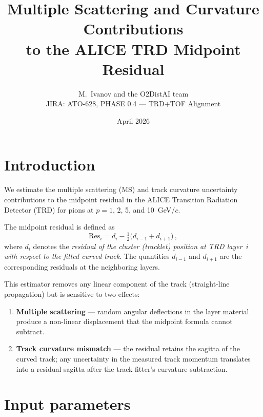 \documentclass[11pt,a4paper]{article}
\title{Multiple Scattering and Curvature Contributions\\
to the ALICE TRD Midpoint Residual}
\author{M.~Ivanov and the O2DistAI team\\[2pt]
{\normalsize JIRA: ATO-628, PHASE 0.4 --- TRD+TOF Alignment}}
\date{April 2026}
\begin{document}
\maketitle

\section{Introduction}

We estimate the multiple scattering (MS) and track curvature uncertainty
contributions to the midpoint residual in the ALICE Transition Radiation
Detector (TRD) for pions at $p = 1$, 2, 5, and 10~GeV/$c$.

The midpoint residual is defined as
\begin{equation}
\label{eq:midpoint}
\mathrm{Res}_i = d_i - \tfrac{1}{2}\bigl(d_{i-1} + d_{i+1}\bigr)\,,
\end{equation}
where $d_i$ denotes the \emph{residual of the cluster (tracklet) position
at TRD layer~$i$ with respect to the fitted curved track}.
The quantities $d_{i-1}$ and $d_{i+1}$ are the corresponding residuals
at the neighboring layers.

This estimator removes any linear component of the track
(straight-line propagation) but is sensitive to two effects:
\begin{enumerate}
\item \textbf{Multiple scattering} --- random angular deflections in the
      layer material produce a non-linear displacement that the midpoint
      formula cannot subtract.
\item \textbf{Track curvature mismatch} --- the residual retains the
      sagitta of the curved track; any uncertainty in the measured track
      momentum translates into a residual sagitta after the track
      fitter's curvature subtraction.
\end{enumerate}

\section{Input parameters}
\end{document}
